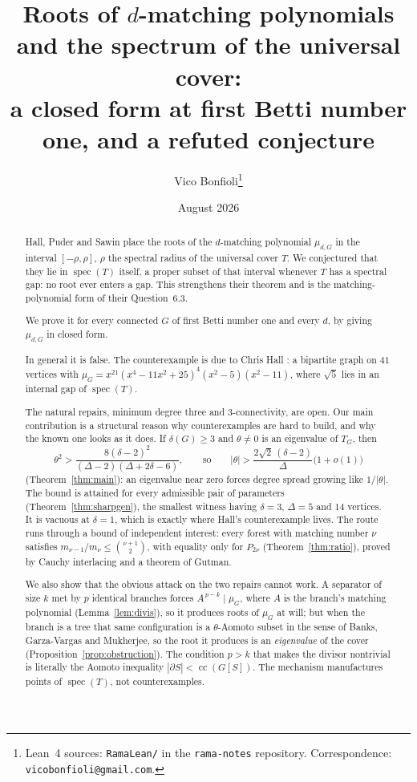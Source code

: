 \documentclass[11pt]{article}
\title{Roots of $d$-matching polynomials and the spectrum of the universal cover:\\
a closed form at first Betti number one, and a refuted conjecture}
\author{Vico Bonfioli\thanks{Lean~4 sources: \texttt{RamaLean/} in the \texttt{rama-notes} repository. Correspondence: \texttt{vicobonfioli@gmail.com}.}}
\date{August 2026}
\theoremstyle{remark}
\begin{document}
\maketitle

\begin{abstract}
Hall, Puder and Sawin place the roots of the $d$-matching polynomial $\mu_{d,G}$ in the interval
$[-\rho,\rho]$, $\rho$ the spectral radius of the universal cover $T$. We conjectured that they
lie in $\operatorname{spec}(T)$ itself, a proper subset of that interval whenever $T$ has a spectral
gap: no root ever enters a gap. This strengthens their theorem and is the matching-polynomial form
of their Question~6.3.

We prove it for every connected $G$ of first Betti number one and every $d$, by giving $\mu_{d,G}$
in closed form.

In general it is false. The counterexample is due to Chris Hall \cite{HallCE}: a bipartite graph on
$41$ vertices with $\mu_G=x^{21}(x^4-11x^2+25)^4(x^2-5)(x^2-11)$, where $\sqrt5$ lies in an internal
gap of $\operatorname{spec}(T)$.

The natural repairs, minimum degree three and $3$-connectivity, are open. Our main contribution is
a structural reason why counterexamples are hard to build, and why the known one looks as it does.
If $\delta(G)\ge3$ and $\theta\ne0$ is an eigenvalue of $T_G$, then
\[
  \theta^2>\frac{8(\delta-2)^2}{(\Delta-2)(\Delta+2\delta-6)},
  \qquad\text{so}\qquad |\theta|>\frac{2\sqrt2\,(\delta-2)}{\Delta}\bigl(1+o(1)\bigr)
\]
(Theorem~\ref{thm:main}): an eigenvalue near zero forces degree spread growing like $1/|\theta|$.
The bound is attained for every admissible pair of parameters (Theorem~\ref{thm:sharpgen}), the
smallest witness having $\delta=3$, $\Delta=5$ and $14$ vertices. It is vacuous at $\delta=1$,
which is exactly where Hall's counterexample lives. The route runs through a bound of independent
interest: every forest with matching number $\nu$ satisfies $m_{\nu-1}/m_\nu\le\binom{\nu+1}{2}$,
with equality only for $P_{2\nu}$ (Theorem~\ref{thm:ratio}), proved by Cauchy interlacing and a
theorem of Gutman.

We also show that the obvious attack on the two repairs cannot work. A separator of size $k$ met by $p$ identical
branches forces $A^{\,p-k}\mid\mu_G$, where $A$ is the branch's matching polynomial
(Lemma~\ref{lem:divis}), so it produces roots of $\mu_G$ at will; but when the branch is a tree that
same configuration is a $\theta$-Aomoto subset in the sense of Banks, Garza-Vargas and Mukherjee, so
the root it produces is an \emph{eigenvalue} of the cover
(Proposition~\ref{prop:obstruction}). The condition $p>k$ that makes the divisor nontrivial is
literally the Aomoto inequality $|\partial S|<\operatorname{cc}(G[S])$. The mechanism manufactures
points of $\operatorname{spec}(T)$, not counterexamples.


\end{abstract}
\end{document}
